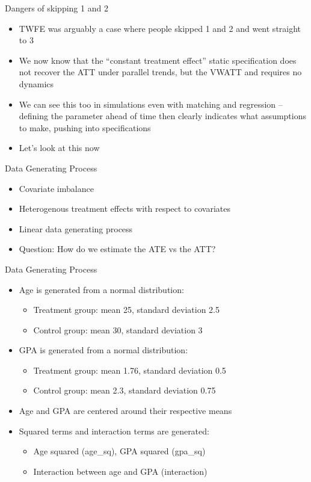 \documentclass{beamer}
\begin{document}
\begin{frame}{Dangers of skipping 1 and 2}

\begin{itemize}

\item TWFE was arguably a case where people skipped 1 and 2 and went straight to 3
\item We now know that the ``constant treatment effect'' static specification does not recover the ATT under parallel trends, but the VWATT and requires no dynamics
\item We can see this too in simulations even with matching and regression -- defining the parameter ahead of time then clearly indicates what assumptions to make, pushing into specifications
\item Let's look at this now
\end{itemize}

\end{frame}

\begin{frame}{Data Generating Process}

\begin{itemize}
\item Covariate imbalance
\item Heterogenous treatment effects with respect to covariates
\item Linear data generating process
\item Question: How do we estimate the ATE vs the ATT?
\end{itemize}

\end{frame}

\begin{frame}{Data Generating Process}
\begin{itemize}
\item Age is generated from a normal distribution:
\begin{itemize}
\item Treatment group: mean 25, standard deviation 2.5
\item Control group: mean 30, standard deviation 3
\end{itemize}
\item GPA is generated from a normal distribution:
\begin{itemize}
\item Treatment group: mean 1.76, standard deviation 0.5
\item Control group: mean 2.3, standard deviation 0.75
\end{itemize}
\item Age and GPA are centered around their respective means
\item Squared terms and interaction terms are generated:
\begin{itemize}
\item Age squared (age_sq), GPA squared (gpa_sq)
\item Interaction between age and GPA (interaction)
\end{itemize}
\end{itemize}
\end{frame}
\end{document}

